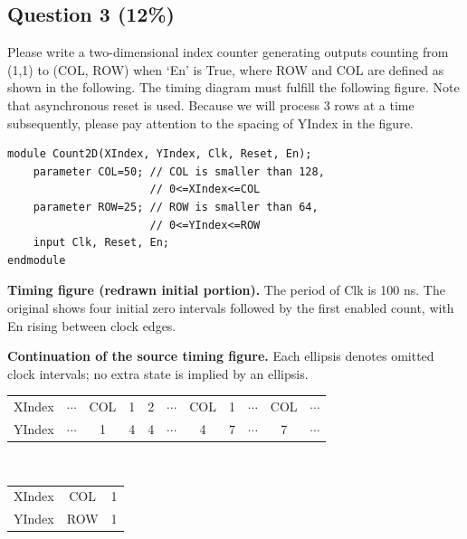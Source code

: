 \documentclass[11pt,a4paper]{article}
\newcommand{\question}[2]{\subsection*{Question #1 \hfill (#2\%)}}
\newcommand{\bus}[3]{%
  \draw (#2,#1)--({#2+.13},{#1+.17})--({#2+.87},{#1+.17})--({#2+1},#1)
    --({#2+.87},{#1-.17})--({#2+.13},{#1-.17})--cycle;
  \node[font=\scriptsize] at ({#2+.5},#1) {#3};}
\newcommand{\clockrow}[2]{%
  \node[anchor=east,font=\small] at (-.2,#1) {Clk};
  \foreach \i in {0,...,#2} {
    \draw (\i,#1)--(\i,{#1+.3})--({\i+.5},{#1+.3})--({\i+.5},#1)--({\i+1},#1);}}
\begin{document}
\question{3}{12}
Please write a two-dimensional index counter generating outputs counting
from (1,1) to (COL, ROW) when `En' is True, where ROW and COL are defined
as shown in the following. The timing diagram must fulfill the following
figure. Note that asynchronous reset is used. Because we will process 3
rows at a time subsequently, please pay attention to the spacing of
YIndex in the figure.
\begin{verbatim}
module Count2D(XIndex, YIndex, Clk, Reset, En);
    parameter COL=50; // COL is smaller than 128,
                      // 0<=XIndex<=COL
    parameter ROW=25; // ROW is smaller than 64,
                      // 0<=YIndex<=ROW
    input Clk, Reset, En;
endmodule
\end{verbatim}
\textbf{Timing figure (redrawn initial portion).} The period of Clk is
100 ns. The original shows four initial zero intervals followed by the
first enabled count, with En rising between clock edges.
\begin{center}
\end{center}
\textbf{Continuation of the source timing figure.} Each ellipsis denotes
omitted clock intervals; no extra state is implied by an ellipsis.
\begin{center}\small
\begin{tabular}{c|cccccccccc}\toprule
XIndex & $\cdots$ & COL & 1 & 2 & $\cdots$ & COL & 1 & $\cdots$ & COL & $\cdots$\\
YIndex & $\cdots$ & 1 & 4 & 4 & $\cdots$ & 4 & 7 & $\cdots$ & 7 & $\cdots$\\\bottomrule
\end{tabular}\\[5pt]
\begin{tabular}{c|cc}\toprule
XIndex & COL & 1\\
YIndex & ROW & 1\\\bottomrule
\end{tabular}
\end{center}
\end{document}
